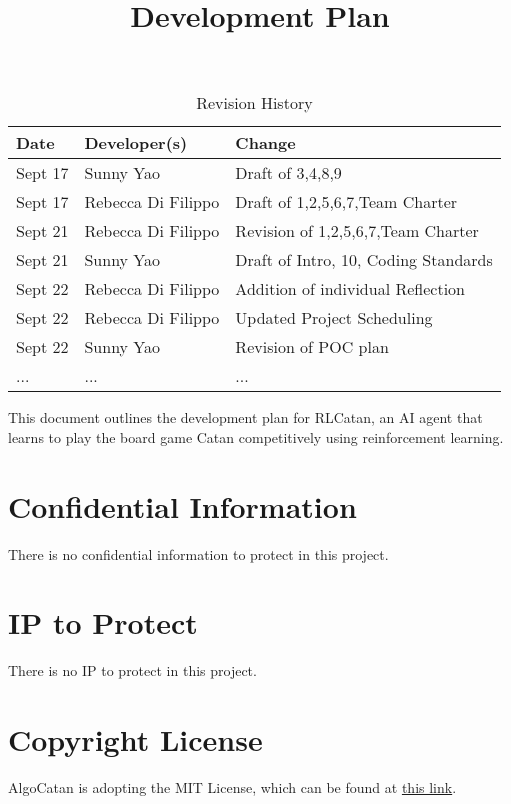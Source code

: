 \documentclass{article}
\title{Development Plan\\\progname}
\author{\authname}
\date{}
\begin{document}
\maketitle

\begin{table}[hp]
\caption{Revision History} \label{TblRevisionHistory}
\begin{tabularx}{\textwidth}{llX}
\toprule
\textbf{Date} & \textbf{Developer(s)} & \textbf{Change}\\
\midrule
Sept 17 & Sunny Yao & Draft of 3,4,8,9\\
Sept 17 & Rebecca Di Filippo & Draft of 1,2,5,6,7,Team Charter\\
Sept 21 & Rebecca Di Filippo & Revision of 1,2,5,6,7,Team Charter\\
Sept 21 & Sunny Yao & Draft of Intro, 10, Coding Standards\\
Sept 22 & Rebecca Di Filippo & Addition of individual Reflection\\
Sept 22 & Rebecca Di Filippo & Updated Project Scheduling\\
Sept 22 & Sunny Yao & Revision of POC plan\\
... & ... & ...\\
\bottomrule
\end{tabularx}
\end{table}

\newpage{}

\raggedright
This document outlines the development plan for RLCatan, an
AI agent that learns to play the board game Catan competitively 
using reinforcement learning. 

\section{Confidential Information}

\raggedright
There is no confidential information to protect in this project.

\section{IP to Protect}

\raggedright
There is no IP to protect in this project.

\section{Copyright License}

\raggedright{AlgoCatan is adopting the MIT License, which can be found at \href{https://github.com/SY3141/RLCatan/blob/main/LICENSE}{this link}.}
\end{document}
